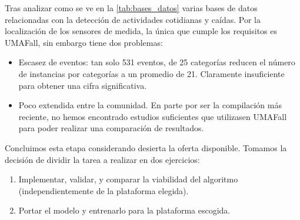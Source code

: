Tras analizar como se ve en la \autoref{tab:bases_datos} varias bases de datos relacionadas con la detección de actividades cotidianas y caídas. Por la localización de los sensores de medida, la única que cumple los requisitos es UMAFall, sin embargo tiene dos problemas:
\begin{itemize}
  \item Escasez de eventos: tan solo 531 eventos, de 25 categorías reducen el número de instancias por categorías a un promedio de 21. Claramente insuficiente para obtener una cifra significativa.
  \item Poco extendida entre la comunidad. En parte por ser la compilación más reciente, no hemos encontrado estudios suficientes que utilizasen UMAFall para poder realizar una comparación de resultados.
\end{itemize}
Concluimos esta etapa considerando desierta la oferta disponible. Tomamos la decisión de dividir la tarea a realizar en dos ejercicios:
\begin{enumerate}
  \item Implementar, validar, y comparar la viabilidad del algoritmo (independientemente de la plataforma elegida).
  \item Portar el modelo y entrenarlo para la plataforma escogida.
\end{enumerate}

